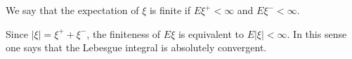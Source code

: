 We say that the expectation of $\xi$ is finite if $E\xi^+ < \infty$ and $E\xi^- < \infty$.

Since $|\xi| = \xi^+ + \xi^-$, the finiteness of $E\xi$ is equivalent to $E|\xi| < \infty$. In this sense one says that the Lebesgue integral is absolutely convergent.
